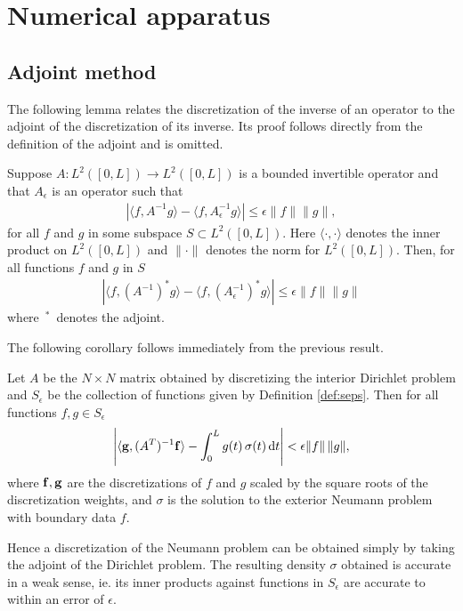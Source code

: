 
\section{Numerical apparatus}
\subsection{Adjoint method}

The following lemma relates the discretization of the inverse of an operator to the adjoint of the discretization of its inverse. Its proof follows directly from the definition of the adjoint and is omitted.
\begin{lemma}\label{lem_adjm}
Suppose $A: L^2([0,L]) \to L^2([0,L])$ is a bounded invertible operator and that $A_\epsilon$ is an operator such that
\begin{align}
\left| \langle f,A^{-1} g \rangle - \langle f,A^{-1}_\epsilon g \rangle \right| \le \epsilon \|f\| \|g\|,
\end{align}
for all $f$ and $g$ in some subspace $S \subset L^2([0,L]).$ Here $\langle \cdot, \cdot \rangle$ denotes the inner product on $L^2([0,L])$ and $\| \cdot\|$ denotes the norm for $L^2([0,L]).$ Then, for all functions $f$ and $g$ in $S$
\begin{align}
\left| \langle f,(A^{-1})^* g \rangle - \langle f,\left(A^{-1}_\epsilon\right)^* g \rangle \right| \le \epsilon \|f\| \|g\|
\end{align}
where $\,{{}^*}\,$ denotes the adjoint.
\end{lemma}

The following corollary follows immediately from the previous result.
\begin{corollary}
Let $A$ be the $N\times N$ matrix obtained by discretizing the interior Dirichlet problem and $S_\epsilon$ be the collection of functions given by Definition \ref{def:seps}. Then for all functions $f,g \in S_\epsilon$
\begin{align}
\left| \langle {\bf g}, (A^T)^{-1}{\bf f} \rangle - \int_0^L g(t)\,\sigma(t)\,{\rm d}t \right| < \epsilon \|f\|\, \|g\|,
\end{align}
where ${\bf f},{\bf g}$ are the discretizations of $f$ and $g$ scaled by the square roots of the discretization weights, and $\sigma$ is the solution to the exterior Neumann problem with boundary data $f$.
\end{corollary}

Hence a discretization of the Neumann problem can be obtained simply by taking the adjoint of the Dirichlet problem. The resulting density $\sigma$ obtained is accurate in a weak sense, ie. its inner products against functions in $S_\epsilon$ are accurate to within an error of $\epsilon.$

